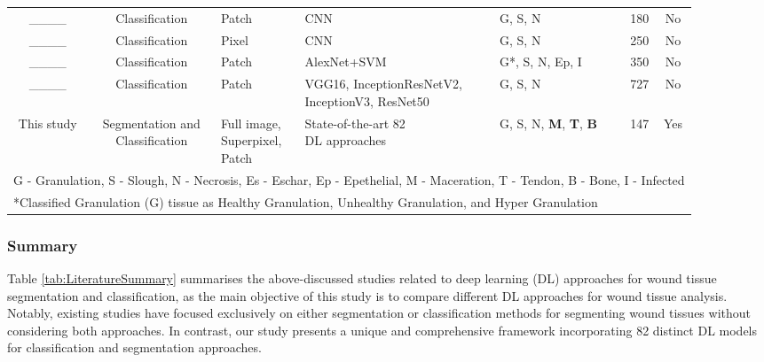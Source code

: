 \begin{table}[!htb]
{\begin{tabular}{@{\extracolsep{4pt}}cclllrc}
                   
____ & Classification  & Patch & CNN  & G, S, N  & 180 & No \\ 
                   
____ & Classification & Pixel  & CNN & G, S, N & 250 & No \\ 
____ & Classification & Patch & AlexNet+SVM & G*, S, N, Ep, I  & 350 &  No\\ 

____ & Classification & Patch & \makecell[t l]{VGG16, InceptionResNetV2,\\InceptionV3, ResNet50} & G, S, N & 727 & No\\
                   

\hline
                   
                
This study & \makecell[t l]{Segmentation and\\Classification} & \makecell[t l]{Full image,\\Superpixel,\\Patch} & \makecell[t l]{State-of-the-art 82\\ DL approaches} & G, S, N,\textbf{ M}, \textbf{T}, \textbf{B}   & 147 & Yes\\  
\hline 

\hline
\multicolumn{7}{l}{G - Granulation, S - Slough, N - Necrosis, Es - Eschar, Ep - Epethelial, M - Maceration, T - Tendon, B - Bone, I - Infected}\\
\multicolumn{7}{l}{*Classified Granulation (G) tissue as Healthy Granulation, Unhealthy Granulation, and Hyper Granulation}
\end{tabular}
}
\end{table}

\subsubsection{Summary}
Table \ref{tab:LiteratureSummary} summarises the above-discussed studies related to deep learning (DL) approaches for wound tissue segmentation and classification, as the main objective of this study is to compare different DL approaches for wound tissue analysis. Notably, existing studies have focused exclusively on either segmentation or classification methods for segmenting wound tissues without considering both approaches. In contrast, our study presents a unique and comprehensive framework incorporating 82 distinct DL models for classification and segmentation approaches. 

